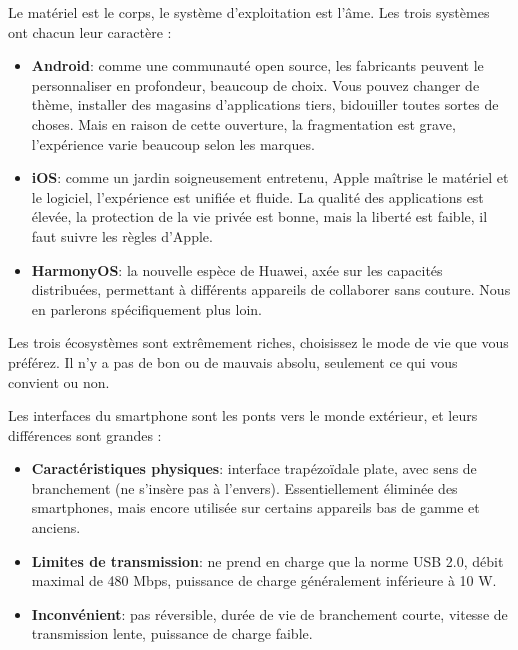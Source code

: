 
Le matériel est le corps, le système d'exploitation est l'âme. Les trois systèmes ont chacun leur caractère :

\begin{itemize}
  \item \textbf{Android}: comme une communauté open source, les fabricants peuvent le personnaliser en profondeur, beaucoup de choix. Vous pouvez changer de thème, installer des magasins d'applications tiers, bidouiller toutes sortes de choses. Mais en raison de cette ouverture, la fragmentation est grave, l'expérience varie beaucoup selon les marques.
  \item \textbf{iOS}: comme un jardin soigneusement entretenu, Apple maîtrise le matériel et le logiciel, l'expérience est unifiée et fluide. La qualité des applications est élevée, la protection de la vie privée est bonne, mais la liberté est faible, il faut suivre les règles d'Apple.
  \item \textbf{HarmonyOS}: la nouvelle espèce de Huawei, axée sur les capacités distribuées, permettant à différents appareils de collaborer sans couture. Nous en parlerons spécifiquement plus loin.
\end{itemize}

Les trois écosystèmes sont extrêmement riches, choisissez le mode de vie que vous préférez. Il n'y a pas de bon ou de mauvais absolu, seulement ce qui vous convient ou non.


Les interfaces du smartphone sont les ponts vers le monde extérieur, et leurs différences sont grandes :


\begin{itemize}
  \item \textbf{Caractéristiques physiques}: interface trapézoïdale plate, avec sens de branchement (ne s'insère pas à l'envers). Essentiellement éliminée des smartphones, mais encore utilisée sur certains appareils bas de gamme et anciens.
  \item \textbf{Limites de transmission}: ne prend en charge que la norme USB 2.0, débit maximal de 480 Mbps, puissance de charge généralement inférieure à 10 W.
  \item \textbf{Inconvénient}: pas réversible, durée de vie de branchement courte, vitesse de transmission lente, puissance de charge faible.
\end{itemize}


